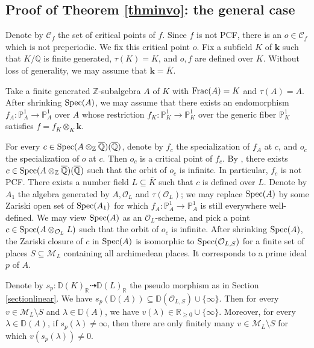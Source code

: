 \documentclass[12pt]{amsart}
\theoremstyle{plain}
\theoremstyle{remark}
\theoremstyle{definition}
\def\Z{\mathbb Z}
\def\Q{\mathbb Q}
\def\R{\mathbb R}
\def\D{\mathbb D}
\def\P{\mathbb P}
\begin{document}
\subsection{Proof of Theorem \ref{thminvo}: the general case}\label{section6.2}
	Denote by $\mathcal{C}_f$ the set of critical points of $f$. Since $f$ is not PCF, there is an $o\in\mathcal{C}_f$ which is not preperiodic. We fix this critical point $o$. Fix a subfield $K$ of $\mathbf{k}$ such that $K/\Q$ is finite generated, $\tau(K)=K$, and $o,f$ are defined over $K$. Without loss of generality, we may assume that $\mathbf{k}=\overline{K}$.\par
	Take a finite generated $\Z$-subalgebra $A$ of $K$ with ${\rm Frac}(A)=K$ and $\tau(A)=A$. After shrinking ${\rm Spec}(A)$, we may assume that there exists an endomorphism $f_A:\P^1_A\to\P^1_A$ over $A$ whose restriction $f_K:\P^1_K\to\P^1_K$ over the generic fiber $\P^1_K$ satisfies $f=f_K\otimes_K\mathbf{k}$.\par 
	For every $c\in{\rm Spec}(A\otimes_{\Z}\overline{\Q})(\overline{\Q})$, denote by $f_c$ the specialization of $f_A$ at $c$, and $o_c$ the specialization of $o$ at $c$. Then $o_c$ is a critical point of $f_c$. By \cite[Lemma 3.3]{Ghioca2018}, there exists $c\in{\rm Spec}(A\otimes_{\Z}\overline{\Q})(\overline{\Q})$ such that the orbit of $o_c$ is infinite. In particular, $f_c$ is not PCF. There exists a number field $L\subseteq \overline{K}$ such that $c$ is defined over $L$. Denote by $A_1$ the algebra generated by $A,\mathcal{O}_L$ and $\tau(\mathcal{O}_L)$; we may replace ${\rm Spec}(A)$ by some Zariski open set of ${\rm Spec}(A_1)$ for which $f_A:\P^1_A\to\P^1_A$ is still everywhere well-defined. We may view ${\rm Spec}(A)$ as an $\mathcal{O}_L$-scheme, and pick a point $c\in{\rm Spec}(A\otimes_{\mathcal{O}_L}L)$ such that the orbit of $o_c$ is infinite. After shrinking ${\rm Spec}(A)$, the Zariski closure of $c$ in ${\rm Spec}(A)$ is isomorphic to ${\rm Spec}(\mathcal{O}_{L,S})$ for a finite set of places $S\subseteq\mathcal{M}_L$ containing all archimedean places. It corresponds to a prime ideal $p$ of $A$.\par 
	Denote by $s_p:\D(K)_{\R}\dashrightarrow\D(L)_{\R}$ the pseudo morphism as in Section \ref{sectionlinear}. We have $s_p(\D(A))\subseteq\D(\mathcal{O}_{L,S})\cup\{\infty\}$. Then for every $v\in\mathcal{M}_L\setminus S$ and $\lambda\in\D(A)$, we have $v(\lambda)\in\R_{\geq0}\cup\{\infty\}$. Moreover, for every $\lambda\in\D(A)$, if $s_p(\lambda)\neq\infty$, then there are only finitely many $v\in\mathcal{M}_L\setminus S$ for which $v(s_p(\lambda))\neq0$.\par 
\end{document}
